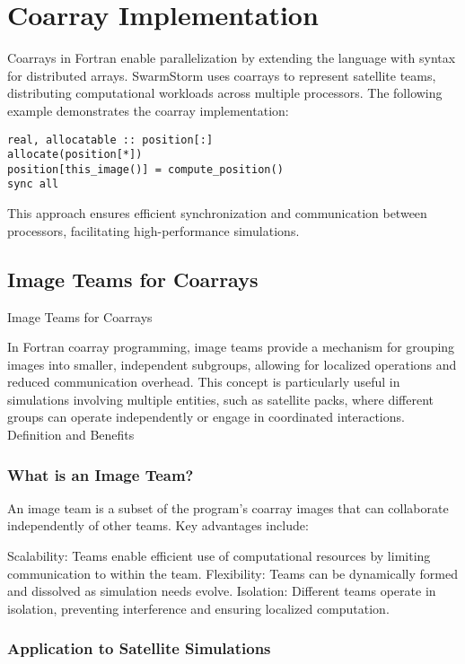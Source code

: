 % 

\section{Coarray Implementation}
Coarrays in Fortran enable parallelization by extending the language with syntax for distributed arrays. SwarmStorm uses coarrays to represent satellite teams, distributing computational workloads across multiple processors. The following example demonstrates the coarray implementation:

\begin{lstlisting}
real, allocatable :: position[:]
allocate(position[*])
position[this_image()] = compute_position()
sync all
\end{lstlisting}

This approach ensures efficient synchronization and communication between processors, facilitating high-performance simulations.
	
	
\subsection{Image Teams for Coarrays}
Image Teams for Coarrays

In Fortran coarray programming, image teams provide a mechanism for grouping images into smaller, independent subgroups, allowing for localized operations and reduced communication overhead. This concept is particularly useful in simulations involving multiple entities, such as satellite packs, where different groups can operate independently or engage in coordinated interactions.
Definition and Benefits

\subsubsection{What is an Image Team?}
An image team is a subset of the program's coarray images that can collaborate independently of other teams. Key advantages include:

    Scalability: Teams enable efficient use of computational resources by limiting communication to within the team.
    Flexibility: Teams can be dynamically formed and dissolved as simulation needs evolve.
    Isolation: Different teams operate in isolation, preventing interference and ensuring localized computation.

\subsubsection{Application to Satellite Simulations}

